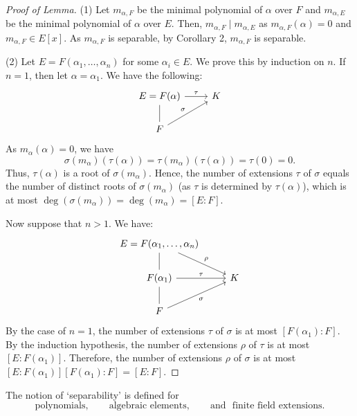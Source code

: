 \documentclass[twoside]{article}
\theoremstyle{remark}
\begin{document}
\begin{proof}[Proof of Lemma]
  (1) Let \(m_{\alpha,F}\) be the minimal polynomial of \(\alpha\) over \(F\) and \(m_{\alpha,E}\) be the minimal polynomial of \(\alpha\) over \(E\). Then, \(m_{\alpha,F} \mid m_{\alpha,E}\) as \(m_{\alpha,F}(\alpha) = 0\) and \(m_{\alpha,F} \in E[x]\). As \(m_{\alpha,F}\) is separable, by Corollary 2, \(m_{\alpha,F}\) is separable.
  
  \smallskip
  
  (2) Let \(E = F(\alpha_1, \dots, \alpha_n)\) for some \(\alpha_i \in E\). We prove this by induction on \(n\). If \(n=1\), then let \(\alpha = \alpha_1\). We have the following:
  \begin{displaymath}
    \begin{tikzcd}
      E = F(\alpha) \rar["\tau"]\dar[dash] & K \\
      F\arrow[ur,"\sigma"]
    \end{tikzcd}
  \end{displaymath}
  As \(m_\alpha(\alpha) = 0\), we have
  \[ \sigma(m_\alpha)(\tau(\alpha)) = \tau(m_\alpha) (\tau(\alpha)) = \tau(0) = 0. \]
  Thus, \(\tau(\alpha)\) is a root of \(\sigma(m_\alpha)\). Hence, the number of extensions \(\tau\) of \(\sigma\) equals the number of distinct roots of \(\sigma(m_\alpha)\) (as \(\tau\) is determined by \(\tau(\alpha)\)), which is at most \(\deg(\sigma(m_\alpha)) = \deg(m_\alpha) = [E:F]\).
  
  Now suppose that \(n>1\). We have:
  \begin{displaymath}
    \begin{tikzcd}
      E = F(\alpha_1, \dots, \alpha_n) \arrow[dr,"\rho"]\dar[dash] \\
      F(\alpha_1)\rar["\tau"]\dar[dash] & K \\
      F\arrow[ur,"\sigma"swap]
    \end{tikzcd}
  \end{displaymath}
  By the case of \(n=1\), the number of extensions \(\tau\) of \(\sigma\) is at most \([F(\alpha_1):F]\). By the induction hypothesis, the number of extensions \(\rho\) of \(\tau\) is at most \([E:F(\alpha_1)]\). Therefore, the number of extensions \(\rho\) of \(\sigma\) is at most \([E:F(\alpha_1)] [F(\alpha_1):F] = [E:F]\).
\end{proof}

The notion of `separability' is defined for
\[ \text{polynomials}, \qquad \text{algebraic elements}, \qquad \text{and~~finite field extensions}. \]
\end{document}

